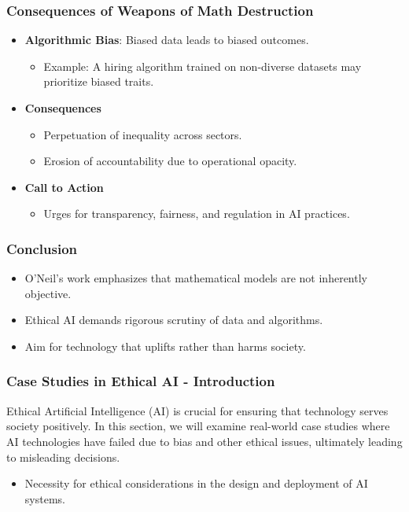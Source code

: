 \documentclass{beamer}
\begin{document}
\begin{frame}[fragile]
    \frametitle{Consequences of Weapons of Math Destruction}
    \begin{itemize}
        \item \textbf{Algorithmic Bias}: Biased data leads to biased outcomes.
            \begin{itemize}
                \item Example: A hiring algorithm trained on non-diverse datasets may prioritize biased traits.
            \end{itemize}
        
        \item \textbf{Consequences}
        \begin{itemize}
            \item Perpetuation of inequality across sectors.
            \item Erosion of accountability due to operational opacity.
        \end{itemize}
        
        \item \textbf{Call to Action}
        \begin{itemize}
            \item Urges for transparency, fairness, and regulation in AI practices.
        \end{itemize}
    \end{itemize}
\end{frame}

\begin{frame}[fragile]
    \frametitle{Conclusion}
    \begin{itemize}
        \item O'Neil's work emphasizes that mathematical models are not inherently objective.
        \item Ethical AI demands rigorous scrutiny of data and algorithms.
        \item Aim for technology that uplifts rather than harms society.
    \end{itemize}
\end{frame}

\begin{frame}[fragile]
    \frametitle{Case Studies in Ethical AI - Introduction}
    Ethical Artificial Intelligence (AI) is crucial for ensuring that technology serves society positively. In this section, we will examine real-world case studies where AI technologies have failed due to bias and other ethical issues, ultimately leading to misleading decisions. 
    \begin{itemize}
        \item Necessity for ethical considerations in the design and deployment of AI systems.
    \end{itemize}
\end{frame}
\end{document}
